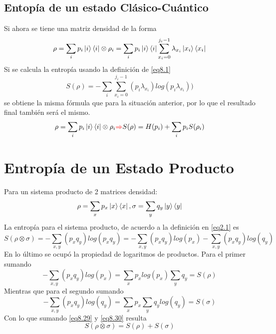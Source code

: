 \documentclass{book}
\begin{document}
    \subsection{{Entopía de un estado Clásico-Cuántico}} Si ahora se tiene una matriz densidad de la forma
    \begin{equation}\label{eq8.24}{\rho=\sum_i p_i \ket{i}\bra{i}\otimes \rho_i=\sum_{i}p_i\ket{i}\bra{i}\sum_{x_i=0}^{j_i-1}\lambda_{x_i} \ket{x_i}\bra{x_i}}\end{equation}
    Si se calcula la entropía usando la definición de \ref{eq8.1}
         \begin{equation}\label{eq8.25}{ S(\rho)=-\sum_{i}\sum_{x_i=0}^{j_i-1}(p_i\lambda_{x_i})log(p_i\lambda_{x_i})) }\end{equation}
    se obtiene la misma fórmula que para la situación anterior, por lo que el resultado final también será el mismo.
    \begin{equation}\label{eq8.26}{\rho=\sum_i p_i \ket{i}\bra{i}\otimes \rho_i \textcolor{red}{\Rightarrow} S(\rho)=H(p_i)+\sum_i p_i S(\rho_i)}\end{equation}

    \section{{Entropía de un Estado Producto}} Para un sistema producto de 2 matrices densidad:
    \begin{equation}\label{eq8.27}{ \rho=\sum_x p_x \ket{x}\bra{x}, \sigma=\sum_y q_y \ket{y}\bra{y}}\end{equation}
    La entropía para el sistema producto, de acuerdo a la definición en \ref{eq2.1} es 
    \begin{equation}\label{eq8.28}{S(\rho\otimes\sigma)=-\sum_{x,y}(p_xq_y)log(p_xq_y)=-\sum_{x,y}(p_xq_y)log(p_x)-\sum_{x,y}(p_xq_y)log(q_y)}\end{equation}
    En lo último se ocupó la propiedad de logaritmos de productos. Para el primer sumando
    \begin{equation}\label{eq8.29}{ -\sum_{x,y}(p_xq_y)log(p_x)=\sum_x p_x log (p_x) \sum_y q_y= S(\rho)}\end{equation}
    Mientras que para el segundo sumando
    \begin{equation}\label{eq8.30}{ -\sum_{x,y}(p_xq_y)log(q_y)=\sum_x p_x\sum_y q_ylog(q_y)=S(\sigma)}\end{equation}
    Con lo que sumando \ref{eq8.29} y \ref{eq8.30} resulta
    \begin{equation}\label{eq8.31}{S(\rho\otimes\sigma)=S(\rho)+S(\sigma)}\end{equation}
\end{document}
